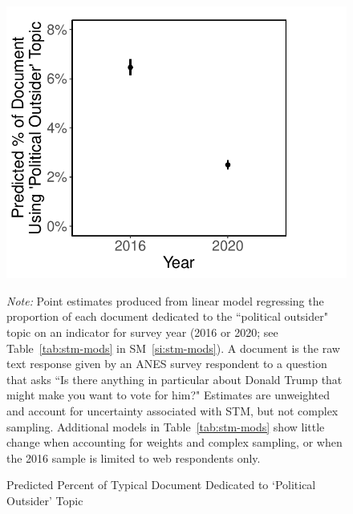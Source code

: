 \documentclass[12pt]{article}
\begin{document}
\begin{figure}[t!]
	\centering
	\includegraphics[width=0.5\linewidth]{Figures/STM-Estimate-Effect-2016-2020.pdf}
	\caption{Predicted Percent of Typical Document Dedicated to `Political Outsider' Topic}\label{fig:stm-2016-2020}
	\vspace{-2em}
	{\singlespacing \scriptsize \textit{Note:} Point estimates produced from linear model regressing the proportion of each document dedicated to the ``political outsider" topic on an indicator for survey year (2016 or 2020; see Table~\ref{tab:stm-mods} in SM~\ref{si:stm-mods}). A document is the raw text response given by an ANES survey respondent to a question that asks ``Is there anything in particular about Donald Trump that might make you want to vote for him?" Estimates are unweighted and account for uncertainty associated with STM, but not complex sampling. Additional models in Table~\ref{tab:stm-mods} show little change when accounting for weights and complex sampling, or when the 2016 sample is limited to web respondents only.\par}
\end{figure}
\end{document}
